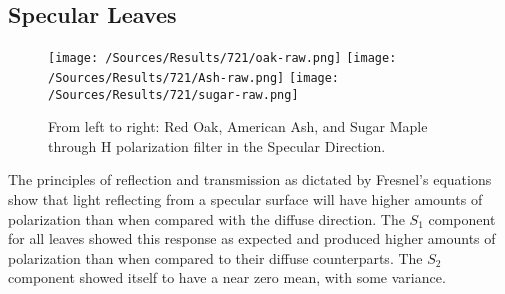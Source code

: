 \subsection{Specular Leaves}
%
\begin{figure}[htp]
    \centering
    \texttt{[image: /Sources/Results/721/oak-raw.png]}\hfill
    \texttt{[image: /Sources/Results/721/Ash-raw.png]}\hfill
    \texttt{[image: /Sources/Results/721/sugar-raw.png]}

    \caption{From left to right: Red Oak, American Ash, and Sugar Maple through H polarization filter in the Specular Direction.}
    \label{fig:specular-raw}
\end{figure}
%
The principles of reflection and transmission as dictated by Fresnel’s equations show that light reflecting from a specular surface will have higher amounts of polarization than when compared with the diffuse direction.  The $S_1$ component for all leaves showed this response as expected and produced higher amounts of polarization than when compared to their diffuse counterparts.  The $S_2$ component showed itself to have a near zero mean, with some variance.

